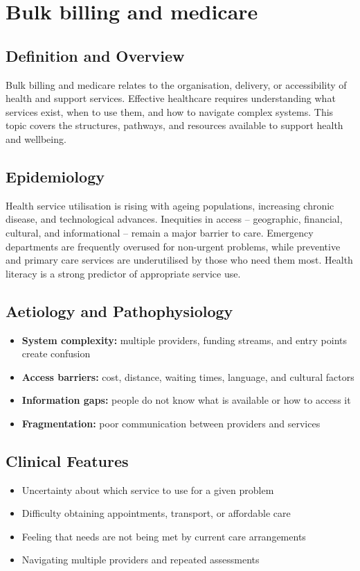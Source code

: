 \chapter{Bulk billing and medicare}

\section*{Definition and Overview}
Bulk billing and medicare relates to the organisation, delivery, or accessibility of health and support services. Effective healthcare requires understanding what services exist, when to use them, and how to navigate complex systems. This topic covers the structures, pathways, and resources available to support health and wellbeing.

\section*{Epidemiology}
Health service utilisation is rising with ageing populations, increasing chronic disease, and technological advances. Inequities in access -- geographic, financial, cultural, and informational -- remain a major barrier to care. Emergency departments are frequently overused for non-urgent problems, while preventive and primary care services are underutilised by those who need them most. Health literacy is a strong predictor of appropriate service use.

\section*{Aetiology and Pathophysiology}
\begin{itemize}
    \item \textbf{System complexity:} multiple providers, funding streams, and entry points create confusion
    \item \textbf{Access barriers:} cost, distance, waiting times, language, and cultural factors
    \item \textbf{Information gaps:} people do not know what is available or how to access it
    \item \textbf{Fragmentation:} poor communication between providers and services
\end{itemize}

\section*{Clinical Features}
\begin{itemize}
    \item Uncertainty about which service to use for a given problem
    \item Difficulty obtaining appointments, transport, or affordable care
    \item Feeling that needs are not being met by current care arrangements
    \item Navigating multiple providers and repeated assessments
\end{itemize}

